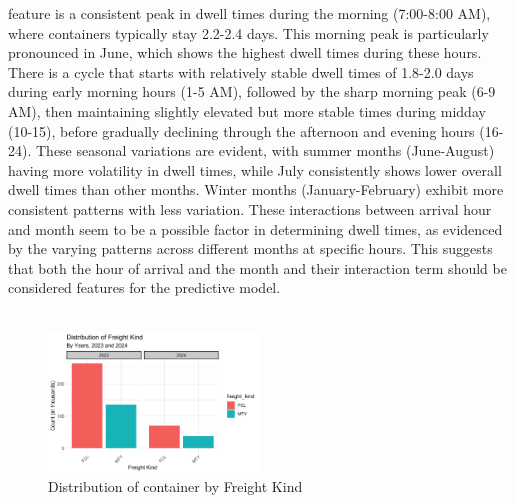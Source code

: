 			feature is a consistent peak in dwell times during the morning (7:00-8:00 AM), where containers typically
			stay 2.2-2.4 days. This morning peak is particularly pronounced in June, which shows the highest dwell
			times during these hours. There is a cycle that starts with relatively stable dwell times of 1.8-2.0 days
			during early morning hours (1-5 AM), followed by the sharp morning peak (6-9 AM), then maintaining slightly
			elevated but more stable times during midday (10-15), before gradually declining through the afternoon and
			evening hours (16-24). These seasonal variations are evident, with summer months (June-August) having more
			volatility in dwell times, while July consistently shows lower overall dwell times than other months.
			Winter months (January-February) exhibit more consistent patterns with less variation. These interactions
			between arrival hour and month seem to be a possible factor in determining dwell times, as evidenced by
			the varying patterns across different months at specific hours. This suggests that both the hour of
			arrival and the month and their interaction term should be considered features for the predictive model.
			\\
			\\
			\begin{figure}[ht]
				\centering
				\includegraphics[width=0.5\textwidth]{images/du_four}
				\caption{Distribution of container by Freight Kind}
				\label{fig:freigh_kind_distribution}
			\end{figure}

